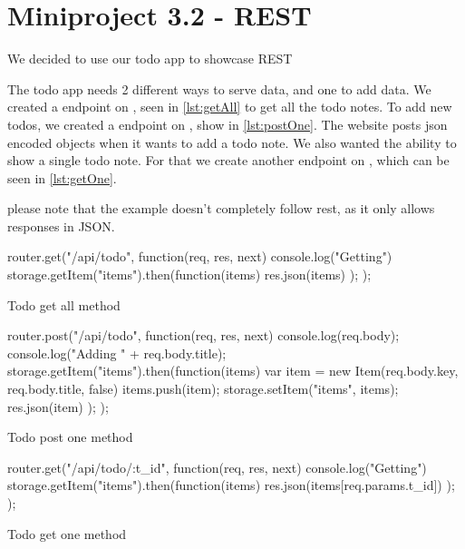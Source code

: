 \chapter{Miniproject 3.2 - REST}
We decided to use our todo app to showcase REST

The todo app needs 2 different ways to serve data, and one to add data. We
created a  endpoint on , seen in
\cref{lst:getAll} to get all the todo notes. To add new todos, we created
a  endpoint on , show in \cref{lst:postOne}. The
website posts json encoded objects when it wants to add a todo note. We also
wanted the ability to show a single todo note. For that we create another
 endpoint on , which can be seen in
\cref{lst:getOne}.

please note that the example doesn't completely follow rest, as it only allows
responses in JSON.

\begin{listing}
    \begin{js}
router.get("/api/todo", function(req, res, next) {
	console.log("Getting")
	storage.getItem("items").then(function(items) {
		res.json(items)
	});
});
    \end{js}
    \caption{Todo get all method}
    \label{lst:getAll}
\end{listing}

\begin{listing}
    \begin{js}
router.post("/api/todo", function(req, res, next) {
	console.log(req.body);
	console.log("Adding " + req.body.title);
	storage.getItem("items").then(function(items) {
		var item = new Item(req.body.key, req.body.title, false)
		items.push(item);
		storage.setItem("items", items);
		res.json(item)
	});
});
    \end{js}
	\caption{Todo post one method}
    \label{lst:postOne}
\end{listing}

\begin{listing}
    \begin{js}
router.get("/api/todo/:t_id", function(req, res, next) {
	console.log("Getting")
	storage.getItem("items").then(function(items) {
		res.json(items[req.params.t_id])
	});
});
    \end{js}
    \caption{Todo get one method}
    \label{lst:getOne}
\end{listing}
